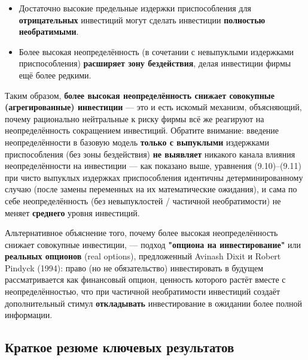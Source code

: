 \documentclass[10pt,a4paper]{article}
\begin{document}
\begin{itemize}[leftmargin=1.3em]
\item Достаточно высокие предельные издержки приспособления для \textbf{отрицательных} инвестиций могут сделать инвестиции \textbf{полностью необратимыми}.
\item Более высокая неопределённость (в сочетании с невыпуклыми издержками приспособления) \textbf{расширяет зону бездействия}, делая инвестиции фирмы ещё более редкими.
\end{itemize}

\begin{intuition}
Таким образом, \textbf{более высокая неопределённость снижает совокупные (агрегированные) инвестиции} — это и есть искомый механизм, объясняющий, почему рационально нейтральные к риску фирмы всё же реагируют на неопределённость сокращением инвестиций. Обратите внимание: введение неопределённости в базовую модель \textbf{только с выпуклыми} издержками приспособления (без зоны бездействия) \textbf{не выявляет} никакого канала влияния неопределённости на инвестиции — как показано выше, уравнения (9.10)--(9.11) при чисто выпуклых издержках приспособления идентичны детерминированному случаю (после замены переменных на их математические ожидания), и сама по себе неопределённость (без невыпуклостей / частичной необратимости) не меняет \textbf{среднего} уровня инвестиций.

Альтернативное объяснение того, почему более высокая неопределённость снижает совокупные инвестиции, — подход \textbf{"опциона на инвестирование"} или \textbf{реальных опционов} (real options), предложенный Avinash Dixit и Robert Pindyck (1994): право (но не обязательство) инвестировать в будущем рассматривается как финансовый опцион, ценность которого растёт вместе с неопределённостью, что при частичной необратимости инвестиций создаёт дополнительный стимул \textbf{откладывать} инвестирование в ожидании более полной информации.
\end{intuition}

\subsection{Краткое резюме ключевых результатов}
\end{document}
